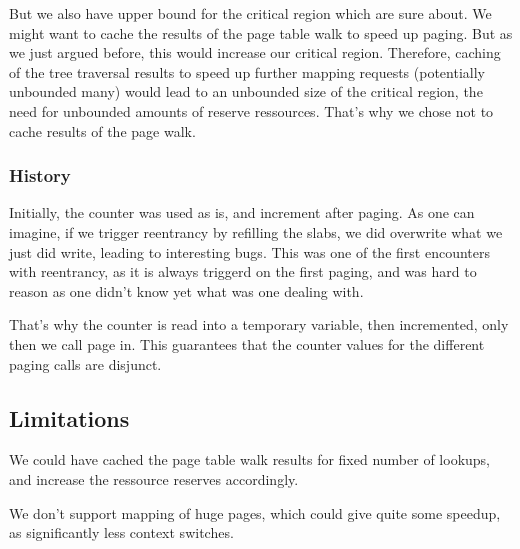 But we also have upper bound for the critical region which are sure about.
We might want to cache the results of the page table walk to speed up paging.
But as we just argued before, this would increase our critical region.
Therefore, caching of the tree traversal results to speed up further mapping
requests (potentially unbounded many) would lead to an unbounded size of the
critical region, the need for unbounded amounts of reserve ressources.
That's why we chose not to cache results of the page walk.

\subsubsection{History}

Initially, the counter was used as is, and increment after paging.
As one can imagine, if we trigger reentrancy by refilling the slabs, we did
overwrite what we just did write, leading to interesting bugs.
This was one of the first encounters with reentrancy, as it is always triggerd
on the first paging, and was hard to reason as one didn't know yet what was one
dealing with.

That's why the counter is read into a temporary variable, then incremented, only
then we call page in.
This guarantees that the counter values for the different paging calls are
disjunct.

\subsection{Limitations}

We could have cached the page table walk results for fixed number of lookups,
and increase the ressource reserves accordingly.

We don't support mapping of huge pages, which could give quite some speedup, as
significantly less context switches.

